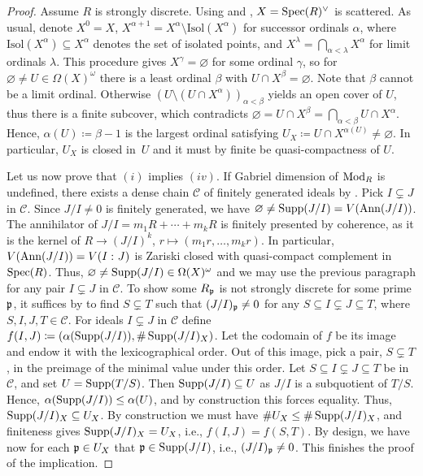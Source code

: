 \documentclass[reqno,a4paper]{amsart}
\begin{document}
\begin{proof}
Assume $R$ is strongly discrete. Using  and , $X=\operatorname{Spec}(R)^\vee$ is scattered. As usual, denote $X^{0}=X$, $X^{\alpha+1}=X^\alpha\setminus\mathrm{Isol}(X^\alpha)$ for successor ordinals $\alpha$, where $\mathrm{Isol}(X^\alpha)\subseteq X^\alpha$ denotes the set of isolated points, and $X^\lambda=\bigcap_{\alpha<\lambda}X^\alpha$ for limit ordinals $\lambda$. This procedure gives $X^\gamma=\varnothing$ for some ordinal $\gamma$, so for $\varnothing \neq U\in\Omega(X)^\omega$ there is a least ordinal $\beta$ with $U\cap X^\beta=\varnothing$. Note that $\beta$ cannot be a limit ordinal. Otherwise $(U\setminus(U\cap X^\alpha))_{\alpha<\beta}$ yields an open cover of $U$, thus there is a finite subcover, which contradicts $\varnothing=U\cap X^\beta=\bigcap_{\alpha<\beta}U\cap X^\alpha$.
    Hence, $\alpha(U)\coloneqq\beta-1$ is the largest ordinal satisfying $U_X\coloneqq U\cap X^{\alpha(U)}\neq\varnothing$. In particular, $U_X$ is closed in~$U$ and it must by finite be quasi-compactness of $U$.

    Let us now prove that $(i)$ implies $(iv)$.
    If Gabriel dimension of $\operatorname{Mod}_R$ is undefined, there exists a dense chain $\mathcal{C}$ of finitely generated ideals by . Pick   $I\subsetneq J$ in $\mathcal{C}$.
    Since $J/I\neq0$ is finitely generated, we have $\varnothing\ne\operatorname{Supp}(J/I)=V(\operatorname{Ann}(J/I))$.
    The annihilator of $J/I=m_1R+\cdots+m_kR$ is finitely presented by coherence, as it is the kernel of $R\to (J/I)^k$, $r\mapsto(m_1r,\dots,m_kr)$. In particular, $V(\operatorname{Ann}(J/I))=V(I\,\colon J)$ is Zariski closed with quasi-compact complement in $\operatorname{Spec}(R)$. 
    Thus, $\varnothing \neq \operatorname{Supp}(J/I)\in\Omega(X)^\omega$ and we may use the previous paragraph for any pair $I\subsetneq J$ in $\mathcal{C}$. To show some $R_{\mathfrak{p}}$ is not strongly discrete for some prime $\mathfrak{p}$, it suffices by  to find $S\subsetneq T$ such that $(J/I)_{\mathfrak{p}}\neq0$ for any $S\subseteq I\subsetneq J\subseteq T$, where $S,I,J,T\in\mathcal{C}$. For ideals $I\subsetneq J$ in $\mathcal{C}$ define $f(I,J)\coloneqq (\alpha(\operatorname{Supp}(J/I)),\# \operatorname{Supp}(J/I)_X)$. Let the codomain of $f$ be its image and endow it with the lexicographical order. Out of this image, pick a pair, $S\subsetneq T$, in the preimage of the minimal value under this order. Let $S\subseteq I\subsetneq J\subseteq T$ be in $\mathcal{C}$, and set $U=\operatorname{Supp}(T/S)$. Then $\operatorname{Supp}(J/I)\subseteq U$ as $J/I$ is a subquotient of $T/S$. Hence, $\alpha (\operatorname{Supp}(J/I))\le\alpha(U)$, and by construction this forces equality. Thus, $\operatorname{Supp}(J/I)_X\subseteq U_X$. By construction we must have $\# U_X\le\# \operatorname{Supp}(J/I)_X$, and finiteness gives $\operatorname{Supp}(J/I)_X=U_X$, i.e., $f(I,J)=f(S,T)$. By design, we have now for each $\mathfrak{p}\in U_X$ that $\mathfrak{p}\in\operatorname{Supp}(J/I)$, i.e., $(J/I)_{\mathfrak{p}}\neq0$.
    This finishes the proof of the implication.


\end{proof}
\end{document}
